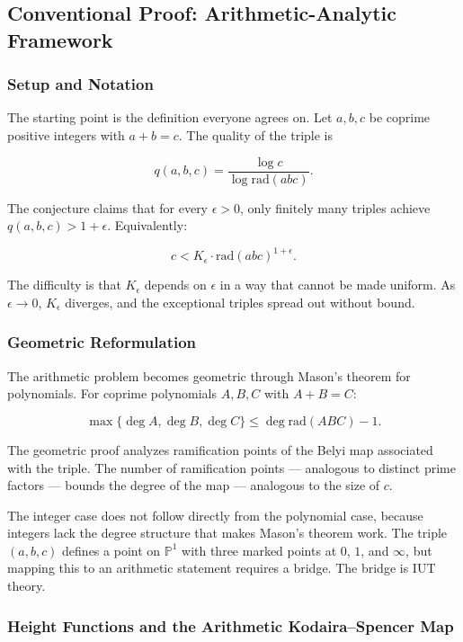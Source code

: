 \documentclass[12pt,a4paper]{article}
\begin{document}
\subsection{Conventional Proof: Arithmetic-Analytic Framework}

\subsubsection{Setup and Notation}

The starting point is the definition everyone agrees on. Let $a, b, c$ be coprime positive integers with $a + b = c$. The quality of the triple is

\[q(a,b,c) = \frac{\log c}{\log \text{rad}(abc)}.\]

The conjecture claims that for every $\epsilon > 0$, only finitely many triples achieve $q(a,b,c) > 1 + \epsilon$. Equivalently:

\[c < K_{\epsilon} \cdot \text{rad}(abc)^{1+\epsilon}.\]

The difficulty is that $K_{\epsilon}$ depends on $\epsilon$ in a way that cannot be made uniform. As $\epsilon \to 0$, $K_{\epsilon}$ diverges, and the exceptional triples spread out without bound.

\subsubsection{Geometric Reformulation}

The arithmetic problem becomes geometric through Mason's theorem for polynomials. For coprime polynomials $A, B, C$ with $A + B = C$:

\[\max\{\deg A, \deg B, \deg C\} \leq \deg \text{rad}(ABC) - 1.\]

The geometric proof analyzes ramification points of the Belyi map associated with the triple. The number of ramification points --- analogous to distinct prime factors --- bounds the degree of the map --- analogous to the size of $c$.

The integer case does not follow directly from the polynomial case, because integers lack the degree structure that makes Mason's theorem work. The triple $(a, b, c)$ defines a point on $\mathbb{P}^1$ with three marked points at $0$, $1$, and $\infty$, but mapping this to an arithmetic statement requires a bridge. The bridge is IUT theory.

\subsubsection{Height Functions and the Arithmetic Kodaira--Spencer Map}
\end{document}
